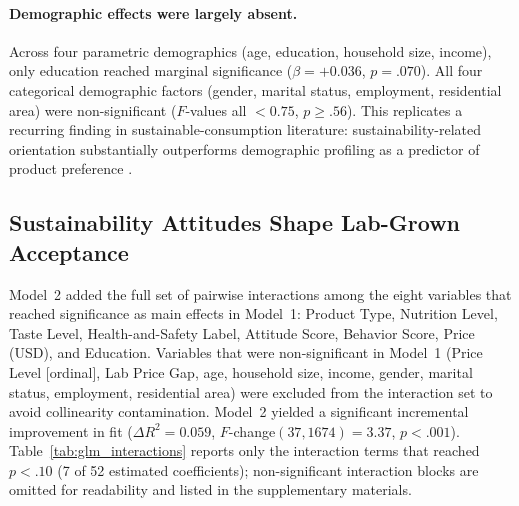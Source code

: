 \paragraph{Demographic effects were largely absent.} Across four parametric demographics (age, education, household size, income), only education reached marginal significance ($\beta=+0.036$, $p=.070$). All four categorical demographic factors (gender, marital status, employment, residential area) were non-significant ($F$-values all $<0.75$, $p\geq.56$). This replicates a recurring finding in sustainable-consumption literature: sustainability-related orientation substantially outperforms demographic profiling as a predictor of product preference \citep{theisz2025,marcus2015}.

\subsection{Sustainability Attitudes Shape Lab-Grown Acceptance}\label{subsec:moderation}

Model~2 added the full set of pairwise interactions among the eight variables that reached significance as main effects in Model~1: Product Type, Nutrition Level, Taste Level, Health-and-Safety Label, Attitude Score, Behavior Score, Price (USD), and Education. Variables that were non-significant in Model~1 (Price Level [ordinal], Lab Price Gap, age, household size, income, gender, marital status, employment, residential area) were excluded from the interaction set to avoid collinearity contamination. Model~2 yielded a significant incremental improvement in fit ($\Delta R^2=0.059$, $F$-change$(37, 1674)=3.37$, $p<.001$). Table~\ref{tab:glm_interactions} reports only the interaction terms that reached $p<.10$ (7 of 52 estimated coefficients); non-significant interaction blocks are omitted for readability and listed in the supplementary materials.

